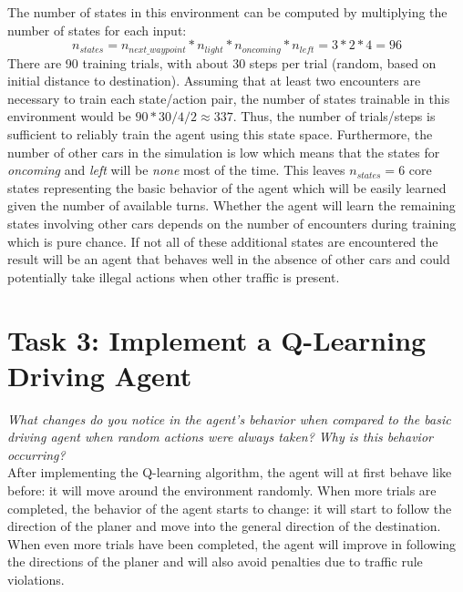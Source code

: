 \documentclass[11pt]{article}
\begin{document}
The number of states in this environment can be computed by multiplying the number of states for each input:
\begin{equation}
n_{states} = n_{next\_waypoint} * n_{light} * n_{oncoming} * n_{left}  = 3 * 2 * 4 =  96
\end{equation}
There are 90 training trials, with about 30 steps per trial (random, based on initial distance to destination). Assuming that at least two encounters are necessary to train each state/action pair, the number of states trainable in this environment would be $90 * 30 / 4 / 2 \approx 337$. Thus, the number of trials/steps is sufficient to reliably train the agent using this state space. Furthermore, the number of other cars in the simulation is low which means that the states for \textit{oncoming} and \textit{left} will be \textit{none} most of the time. This leaves $n_{states} = 6$ core states representing the basic behavior of the agent which will be easily learned given the number of available turns. Whether the agent will learn the remaining states involving other cars depends on the number of encounters during training which is pure chance. If not all of these additional states are encountered the result will be an agent that behaves well in the absence of other cars and could potentially take illegal actions when other traffic is present.

\section*{Task 3: Implement a Q-Learning Driving Agent}
\textit{What changes do you notice in the agent's behavior when compared to the basic driving agent when random actions were always taken? Why is this behavior occurring?}\\

After implementing the Q-learning algorithm, the agent will at first behave like before: it will move around the environment randomly. When more trials are completed, the behavior of the agent starts to change: it will start to follow the direction of the planer and move into the general direction of the destination. When even more trials have been completed, the agent will improve in following the directions of the planer and will also avoid penalties due to traffic rule violations.
\end{document}
